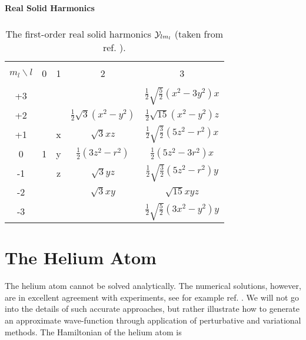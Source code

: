 \begin{table}[hbtp]
\begin{center} {\large \bf Real Solid Harmonics} \\ 
$\phantom{a}$ \\
\begin{tabular}{ccccc}
\hline\\ 
$m_l\backslash l$ & \phantom{AA}0\phantom{AA}
& \phantom{AA}1\phantom{AA} & \phantom{AA}2\phantom{AA} &
\phantom{AA}3\phantom{AA} \\ 
\hline\\ 
+3& & &
&$\frac{1}{2}\sqrt{\frac{5}{2}}(x^2-3y^2)x$ \\ [7pt] 
+2& & &$\frac{1}{2}\sqrt{3}(x^2-y^2)$&$\frac{1}{2}\sqrt{15}(x^2-y^2)z$
\\ [7pt] 
+1& &x&$\sqrt{3}xz$
&$\frac{1}{2}\sqrt{\frac{3}{2}}(5z^2-r^2)x$ \\ [7pt] 
0&1&y&$\frac{1}{2}(3z^2-r^2)$       &$\frac{1}{2}(5z^2-3r^2)x$ \\
 [7pt] 
-1& &z&$\sqrt{3}yz$
&$\frac{1}{2}\sqrt{\frac{3}{2}}(5z^2-r^2)y$ \\ [7pt] 
-2& & &$\sqrt{3}xy$                  &$\sqrt{15}xyz$ \\ [7pt] 
-3& & &
&$\frac{1}{2}\sqrt{\frac{5}{2}}(3x^2-y^2)y$ \\ [7pt] 
\hline
\end{tabular} 
\end{center}
\caption{The first-order real solid harmonics ${\cal Y}_{lm_l}$ (taken from
  ref. \cite{atkins2003}).} 
\label{solidHarmonics}
\end{table}






\section{The Helium Atom}
\label{TheHeliumAtom}

The helium atom cannot be solved analytically. The numerical
solutions, however, are in excellent agreement with
experiments, see for example ref. \cite{coldwell1997}. We will not
go into the details of such accurate approaches, but rather illustrate
how to generate an approximate wave-function through application of 
perturbative and variational methods.
\newline
%
\newline
The Hamiltonian of the helium atom is

